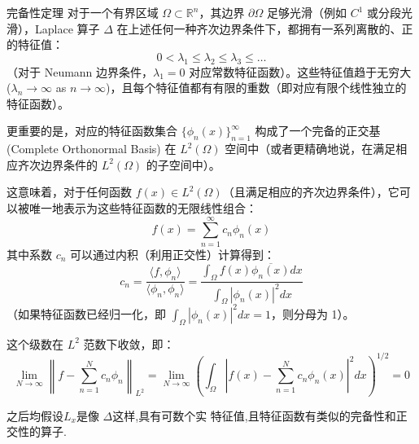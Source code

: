 \documentclass[../../main.tex]{subfiles}
\begin{document}
\begin{theorem}{完备性定理}
    对于一个有界区域 $\Omega \subset \mathbb{R}^n$，其边界 $\partial \Omega$ 足够光滑（例如 $C^1$ 或分段光滑），Laplace 算子 $\Delta$ 在上述任何一种齐次边界条件下，都拥有一系列离散的、正的特征值：
$$ 0 < \lambda_1 \le \lambda_2 \le \lambda_3 \le \dots $$
（对于 Neumann 边界条件，$\lambda_1=0$ 对应常数特征函数）。这些特征值趋于无穷大 ($\lambda_n \to \infty$ as $n \to \infty$)，且每个特征值都有有限的重数（即对应有限个线性独立的特征函数）。

更重要的是，对应的特征函数集合 $\{\phi_n(x)\}_{n=1}^\infty$ 构成了一个完备的正交基 (Complete Orthonormal Basis) 在 $L^2(\Omega)$ 空间中（或者更精确地说，在满足相应齐次边界条件的 $L^2(\Omega)$ 的子空间中）。

这意味着，对于任何函数 $f(x) \in L^2(\Omega)$（且满足相应的齐次边界条件），它可以被唯一地表示为这些特征函数的无限线性组合：
$$ f(x) = \sum_{n=1}^{\infty} c_n \phi_n(x) $$
其中系数 $c_n$ 可以通过内积（利用正交性）计算得到：
$$ c_n = \frac{\langle f, \phi_n \rangle}{\langle \phi_n, \phi_n \rangle} = \frac{\int_{\Omega} f(x) \overline{\phi_n(x)} dx}{\int_{\Omega} |\phi_n(x)|^2 dx} $$
（如果特征函数已经归一化，即 $\int_{\Omega} |\phi_n(x)|^2 dx = 1$，则分母为 1）。

这个级数在 $L^2$ 范数下收敛，即：
$$ \lim_{N \to \infty} \left\| f - \sum_{n=1}^{N} c_n \phi_n \right\|_{L^2} = \lim_{N \to \infty} \left( \int_{\Omega} \left| f(x) - \sum_{n=1}^{N} c_n \phi_n(x) \right|^2 dx \right)^{1/2} = 0 $$
\end{theorem}


之后均假设\(  L_{x}  \)是像 \(   \Delta   \)这样,具有可数个实   特征值,且特征函数有类似的完备性和正交性的算子. 
\end{document}
